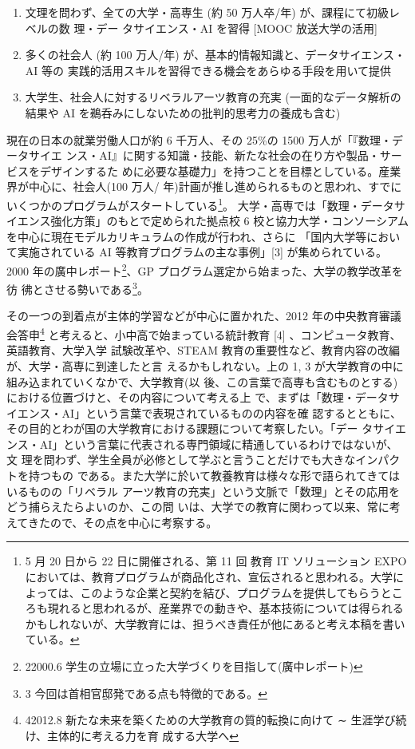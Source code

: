 \documentclass[
]{book}
\theoremstyle{definition}
\theoremstyle{definition}
\theoremstyle{definition}
\theoremstyle{definition}
\theoremstyle{remark}
\begin{document}
\begin{enumerate}
\def\labelenumi{\arabic{enumi}.}
\item
  文理を問わず、全ての大学・高専生 (約 50 万人卒/年) が、課程にて初級レベルの数 理・デー タサイエンス・AI を習得 {[}MOOC 放送大学の活用{]}
\item
  多くの社会人 (約 100 万人/年) が、基本的情報知識と、データサイエンス・AI 等の 実践的活用スキルを習得できる機会をあらゆる手段を用いて提供
\item
  大学生、社会人に対するリベラルアーツ教育の充実 (一面的なデータ解析の結果や AI を鵜呑みにしないための批判的思考力の養成も含む)
\end{enumerate}

現在の日本の就業労働人口が約 6 千万人、その 25\%の 1500 万人が「『数理・データサイエ ンス・AI』に関する知識・技能、新たな社会の在り方や製品・サービスをデザインするた めに必要な基礎力」を持つことを目標としている。産業界が中心に、社会人(100 万人/ 年)計画が推し進められるものと思われ、すでにいくつかのプログラムがスタートしている\footnote{5 月 20 日から 22 日に開催される、第 11 回 教育 IT ソリューション EXPO においては、教育プログラムが商品化され、宣伝されると思われる。大学によっては、このような企業と契約を結び、プログラムを提供してもらうところも現れると思われるが、産業界での動きや、基本技術については得られるかもしれないが、大学教育には、担うべき責任が他にあると考え本稿を書いている。}。
大学・高専では「数理・データサイエンス強化方策」のもとで定められた拠点校 6 校と協力大学・コンソーシアムを中心に現在モデルカリキュラムの作成が行われ、さらに
「国内大学等において実施されている AI 等教育プログラムの主な事例」{[}3{]} が集められている。2000 年の廣中レポート\footnote{22000.6 学生の立場に立った大学づくりを目指して(廣中レポート)}、GP プログラム選定から始まった、大学の教学改革を彷 彿とさせる勢いである\footnote{3 今回は首相官邸発である点も特徴的である。}。

その一つの到着点が主体的学習などが中心に置かれた、2012 年の中央教育審議会答申\footnote{42012.8 新たな未来を築くための大学教育の質的転換に向けて ∼ 生涯学び続け、主体的に考える力を育
  成する大学へ} と考えると、小中高で始まっている統計教育 {[}4{]} 、コンピュータ教育、英語教育、大学入学 試験改革や、STEAM 教育の重要性など、教育内容の改編が、大学・高専に到達したと言 えるかもしれない。上の 1, 3 が大学教育の中に組み込まれていくなかで、大学教育(以 後、この言葉で高専も含むものとする)における位置づけと、その内容について考える上 で、まずは「数理・データサイエンス・AI」という言葉で表現されているものの内容を確 認するとともに、その目的とわが国の大学教育における課題について考察したい。「デー タサイエンス・AI」という言葉に代表される専門領域に精通しているわけではないが、文 理を問わず、学生全員が必修として学ぶと言うことだけでも大きなインパクトを持つもの である。また大学に於いて教養教育は様々な形で語られてきてはいるものの「リベラル アーツ教育の充実」という文脈で「数理」とその応用をどう捕らえたらよいのか、この問 いは、大学での教育に関わって以来、常に考えてきたので、その点を中心に考察する。
\end{document}
